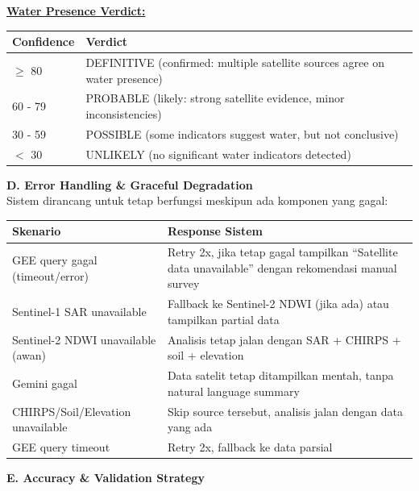 \documentclass[12pt,a4paper]{article}
\newcommand{\subsectionbox}[1]{%
  \textbf{\large #1}\\[0.3cm]
}
\begin{document}
\textbf{\underline{Water Presence Verdict:}}

\begin{tabularx}{\textwidth}{|l|X|}
  \hline
  \textbf{Confidence} & \textbf{Verdict} \\
  \hline
  $\ge$ 80 & DEFINITIVE (confirmed: multiple satellite sources agree on water presence) \\
  60 - 79 & PROBABLE (likely: strong satellite evidence, minor inconsistencies) \\
  30 - 59 & POSSIBLE (some indicators suggest water, but not conclusive) \\
  $<$ 30 & UNLIKELY (no significant water indicators detected) \\
  \hline
\end{tabularx}

\vspace{0.5cm}

\subsectionbox{D. Error Handling \& Graceful Degradation}

Sistem dirancang untuk tetap berfungsi meskipun ada komponen yang gagal:

\begin{tabularx}{\textwidth}{|l|X|}
  \hline
  \textbf{Skenario} & \textbf{Response Sistem} \\
  \hline
  GEE query gagal (timeout/error) & Retry 2x, jika tetap gagal tampilkan ``Satellite data unavailable'' dengan rekomendasi manual survey \\
  Sentinel-1 SAR unavailable & Fallback ke Sentinel-2 NDWI (jika ada) atau tampilkan partial data \\
  Sentinel-2 NDWI unavailable (awan) & Analisis tetap jalan dengan SAR + CHIRPS + soil + elevation \\
  Gemini gagal & Data satelit tetap ditampilkan mentah, tanpa natural language summary \\
  CHIRPS/Soil/Elevation unavailable & Skip source tersebut, analisis jalan dengan data yang ada \\
  GEE query timeout & Retry 2x, fallback ke data parsial \\
  \hline
\end{tabularx}

\vspace{0.5cm}

\subsectionbox{E. Accuracy \& Validation Strategy}
\end{document}
